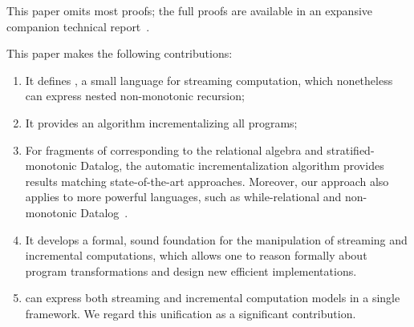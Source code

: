 This paper omits most proofs; the full proofs are available in an expansive  
companion technical report~\cite{tr}.

This paper makes the following contributions:
\begin{enumerate}[nosep, leftmargin=0pt, itemindent=0.5cm, label=\textbf{(\arabic{*})}]
    \item It defines \dbsp, a small language for streaming computation, which
    nonetheless can express nested non-monotonic recursion;
    \item It provides an algorithm incrementalizing all \dbsp programs;
    \item For fragments of \dbsp corresponding to the relational algebra and stratified-monotonic 
    Datalog, 
    the automatic incrementalization algorithm provides results matching state-of-the-art approaches.
    Moreover, our approach also applies to more powerful languages, such as while-relational and non-monotonic 
    Datalog~\cite{Abiteboul-book95}.
    \item It develops a formal, sound foundation for the manipulation of streaming and incremental computations,
    which allows one to reason formally about program transformations and design new efficient implementations.
    \item \dbsp can express both streaming and incremental computation models in a single framework.  We regard this unification as a significant contribution.
\end{enumerate}
